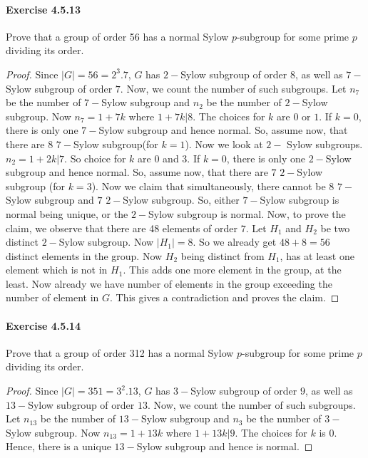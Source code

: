 \documentclass{article}
\theoremstyle{definition}
\begin{document}
\paragraph{Exercise 4.5.13} Prove that a group of order 56 has a normal Sylow $p$-subgroup for some prime $p$ dividing its order.
\begin{proof}    
Since $|G|=56=2^{3}.7$, $G$ has $2-$Sylow subgroup of order $8$, as well as $7-$Sylow subgroup of order $7$. Now, we count the number of such subgroups. Let $n_{7}$ be the number of  $7-$Sylow subgroup and $n_{2}$ be the number of  $2-$Sylow subgroup. Now $n_{7}=1+7k$ where $1+7k|8$. The choices for $k$ are $0$ or $1$. If $k=0$, there is only one $7-$Sylow subgroup and hence normal. So, assume now, that there are $8$ $7-$Sylow subgroup(for $k=1$). Now we look at $2-$ Sylow subgroups. $n_{2}=1+2k| 7$. So choice for $k$ are $0$ and $3$. If $k=0$, there is only one $2-$Sylow subgroup and hence normal. So, assume now, that there are $7$ $2-$Sylow subgroup (for $k=3$). Now we claim that simultaneously, there cannot be $8$ $7-$Sylow subgroup and $7$ $2-$Sylow subgroup. So, either $7-$Sylow subgroup is normal being unique, or  the $2-$Sylow subgroup is normal. Now, to prove the claim, we observe that there are 48 elements of order $7$. Let $H_{1}$ and $H_{2}$ be two distinct  $2-$Sylow subgroup. Now $|H_{1}|=8$. So we already get $48+8=56$ distinct elements in the group. Now $H_{2}$ being distinct from $H_{1}$, has at least one element which is not in $H_{1}$. This adds one more element in the group, at the least. Now already we have number of elements in the group exceeding the number of element in $G$. This gives a contradiction and proves the claim.
\end{proof}



\paragraph{Exercise 4.5.14} Prove that a group of order 312 has a normal Sylow $p$-subgroup for some prime $p$ dividing its order.
\begin{proof}
    Since $|G|=351=3^{2}.13$, $G$ has $3-$Sylow subgroup of order $9$, as well as $13-$Sylow subgroup of order $13$. Now, we count the number of such subgroups. Let $n_{13}$ be the number of $13-$Sylow subgroup and $n_{3}$ be the number of  $3-$Sylow subgroup. Now $n_{13}=1+13k$ where $1+13k|9$. The choices for $k$ is $0$. Hence, there is a unique $13-$Sylow subgroup and hence is normal.

\end{proof}
\end{document}
